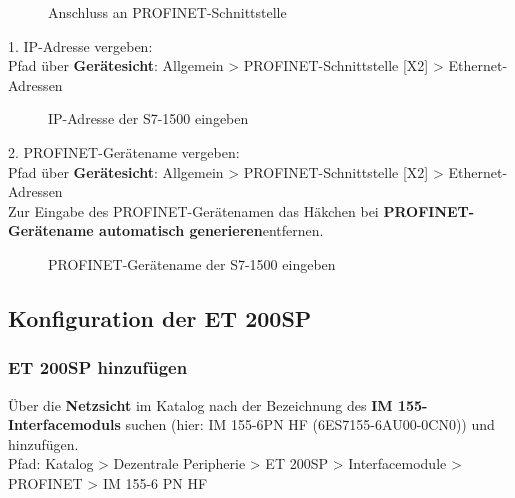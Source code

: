 \begin{figure}[H]
   \centering
   \caption[Anschluss an PROFINET-Schnittstelle]{Anschluss an PROFINET-Schnittstelle}
   \label{fig:Bild6.17}
\end{figure}

1. IP-Adresse vergeben:\\
Pfad über \textbf{Gerätesicht}: Allgemein > PROFINET-Schnittstelle [X2] > Ethernet-Adressen
\begin{figure}[H]
   \centering
   \caption[IP-Adresse der S7-1500 eingeben]{IP-Adresse der S7-1500 eingeben}
   \label{fig:Bild6.18}
\end{figure}

\clearpage

2. PROFINET-Gerätename vergeben:\\
Pfad über \textbf{Gerätesicht}: Allgemein > PROFINET-Schnittstelle [X2] > Ethernet-Adressen\\
\newline
Zur Eingabe des PROFINET-Gerätenamen das Häkchen bei \glqq\textbf{PROFINET-Gerätename automatisch generieren}\grqq\:entfernen.

\begin{figure}[H]
   \centering
   \caption[PROFINET-Gerätename der S7-1500 eingeben]{PROFINET-Gerätename der S7-1500 eingeben}
   \label{fig:Bild6.19}
\end{figure}

\clearpage

\subsection{Konfiguration der ET 200SP} \label{sec:Konfiguration_der_ET_200_SP}

\subsubsection{ET 200SP hinzufügen}
Über die \textbf{Netzsicht} im Katalog nach der Bezeichnung des \textbf{IM 155-Interfacemoduls} suchen (hier: IM 155-6PN HF (6ES7155-6AU00-0CN0)) und hinzufügen.\\
Pfad: Katalog > Dezentrale Peripherie > ET 200SP > Interfacemodule > PROFINET > IM 155-6 PN HF

